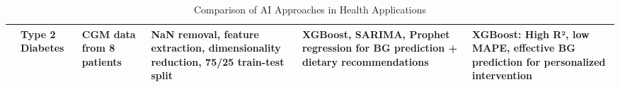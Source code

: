 \begin{table}[htbp]
\begin{adjustwidth}{-2cm}{-2cm}
\begin{tabular}{|p{1.5cm}|p{2.5cm}|p{3cm}|p{3.5cm}|p{2.5cm}|p{2.5cm}|}
\hline
\cite{article_9} & Type 2 Diabetes & CGM data from 8 patients & NaN removal, feature extraction, dimensionality reduction, 75/25 train-test split & XGBoost, SARIMA, Prophet regression for BG prediction + dietary recommendations & XGBoost: High R², low MAPE, effective BG prediction for personalized intervention \\
\hline
\end{tabular}
\caption{Comparison of AI Approaches in Health Applications}
\label{tab:ai_health_comparison}
\end{adjustwidth}
\end{table}



 




